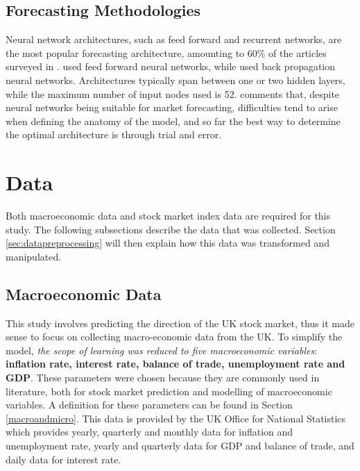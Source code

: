 \documentclass{UoYCSproject}
\begin{document}
\subsection{Forecasting Methodologies}
Neural network architectures, such as feed forward and recurrent networks, are the most popular forecasting architecture, amounting to 60\% of the articles surveyed in  \cite{atsalakis2009surveying}. \cite{ajith2003hybrid, andreou2000testing, pantazopoulos1998financial,phua2001neural, refenes1997neural, thawornwong2004adaptive} used feed forward neural networks, while \cite{barnes2000study, leigh2002analysis, witkowska1995neural} used back propagation neural networks. Architectures typically span between one or two hidden layers, while the maximum number of input nodes used is 52. \cite{atsalakis2009surveying} comments that, despite neural networks being suitable for market forecasting, difficulties tend to arise when defining the anatomy of the model, and so far the best way to determine the optimal architecture is through trial and error. 

\section{Data} 
\label{sec:data}
Both macroeconomic data and stock market index data are required for this study. The following subsections describe the data that was collected. Section \ref{sec:datapreprocessing} will then explain how this data was transformed and manipulated.

\subsection{Macroeconomic Data}
This study involves predicting the direction of the UK stock market, thus it made sense to focus on collecting macro-economic data from the UK. To simplify the model, \textit{the scope of learning was reduced to five macroeconomic variables}: \textbf{inflation rate, interest rate, balance of trade,  unemployment rate and GDP}. These parameters were chosen because they are commonly used in literature, both for stock market prediction and modelling of macroeconomic variables. A definition for these parameters can be found in Section \ref{macroandmicro}. This data is provided by the UK Office for National Statistics which provides yearly, quarterly and monthly data for inflation and unemployment rate, yearly and quarterly data for GDP and balance of trade, and daily data for interest rate. 
\end{document}

